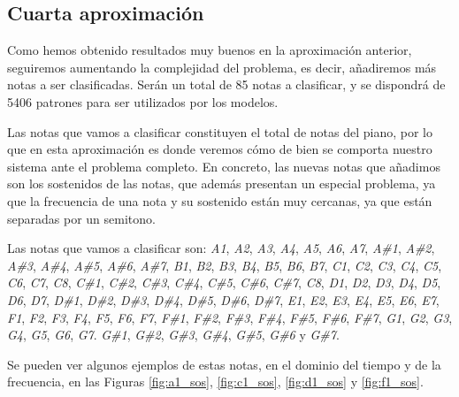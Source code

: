 \documentclass[12pt]{article}
\begin{document}
\newpage
\subsection{Cuarta aproximación}
\label{Cuarta aproximación}
Como hemos obtenido resultados muy buenos en la aproximación anterior, seguiremos aumentando la complejidad del problema,
es decir, añadiremos más notas a ser clasificadas. Serán un total de 85 notas a clasificar, y se dispondrá de 
5406 patrones para ser utilizados por los modelos. 

\bigskip
Las notas que vamos a clasificar constituyen el total de notas del
piano, por lo que en esta aproximación es donde veremos cómo de bien se comporta nuestro sistema ante el problema
completo.
En concreto, las nuevas notas que añadimos son los sostenidos de las notas, que además presentan un especial problema,
ya que la frecuencia de una nota y su sostenido están muy cercanas, ya que están separadas por un semitono.

\bigskip
Las notas que vamos a clasificar son: 
\textit{A1}, \textit{A2}, \textit{A3}, \textit{A4}, \textit{A5}, \textit{A6}, \textit{A7},
\textit{A\#1}, \textit{A\#2}, \textit{A\#3}, \textit{A\#4}, \textit{A\#5}, \textit{A\#6}, \textit{A\#7},
\textit{B1}, \textit{B2}, \textit{B3}, \textit{B4}, \textit{B5}, \textit{B6}, \textit{B7},
\textit{C1}, \textit{C2}, \textit{C3}, \textit{C4}, \textit{C5}, \textit{C6}, \textit{C7}, \textit{C8},
\textit{C\#1}, \textit{C\#2}, \textit{C\#3}, \textit{C\#4}, \textit{C\#5}, \textit{C\#6}, \textit{C\#7}, \textit{C8}, 
\textit{D1}, \textit{D2}, \textit{D3}, \textit{D4}, \textit{D5}, \textit{D6}, \textit{D7},
\textit{D\#1}, \textit{D\#2}, \textit{D\#3}, \textit{D\#4}, \textit{D\#5}, \textit{D\#6}, \textit{D\#7},
\textit{E1}, \textit{E2}, \textit{E3}, \textit{E4}, \textit{E5}, \textit{E6}, \textit{E7},
\textit{F1}, \textit{F2}, \textit{F3}, \textit{F4}, \textit{F5}, \textit{F6}, \textit{F7},
\textit{F\#1}, \textit{F\#2}, \textit{F\#3}, \textit{F\#4}, \textit{F\#5}, \textit{F\#6}, \textit{F\#7},
\textit{G1}, \textit{G2}, \textit{G3}, \textit{G4}, \textit{G5}, \textit{G6}, \textit{G7}.
\textit{G\#1}, \textit{G\#2}, \textit{G\#3}, \textit{G\#4}, \textit{G\#5}, \textit{G\#6} y \textit{G\#7}.

Se pueden ver algunos ejemplos de estas notas, en el dominio del tiempo y de la frecuencia, en las Figuras
\ref{fig:a1_sos}, \ref{fig:c1_sos}, \ref{fig:d1_sos} y \ref{fig:f1_sos}.
\end{document}
